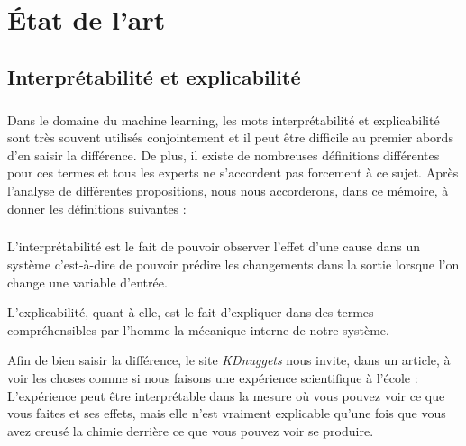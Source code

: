\chapter{État de l’art}
\section{Interprétabilité et explicabilité}

\paragraph{}Dans le domaine du machine learning, les mots interprétabilité et explicabilité sont très souvent utilisés conjointement et il peut être difficile au premier abords d'en saisir la différence. De plus, il existe de nombreuses définitions différentes pour ces termes et tous les experts ne s'accordent pas forcement à ce sujet. Après l'analyse de différentes propositions, nous nous accorderons, dans ce mémoire, à donner les définitions suivantes :

\paragraph{}L'interprétabilité est le fait de pouvoir observer l'effet d'une cause dans un système c'est-à-dire de pouvoir prédire les changements dans la sortie lorsque l'on change une variable d'entrée.\par
L'explicabilité, quant à elle, est le fait d'expliquer dans des termes compréhensibles par l'homme la mécanique interne de notre système.\par
Afin de bien saisir la différence, le site \textit{KDnuggets} nous invite, dans un article\cite{kdInterpre}, à voir les choses comme si nous faisons une expérience scientifique à l'école : L'expérience peut être interprétable dans la mesure où vous pouvez voir ce que vous faites et ses effets, mais elle n'est vraiment explicable qu'une fois que vous avez creusé la chimie derrière ce que vous pouvez voir se produire.

